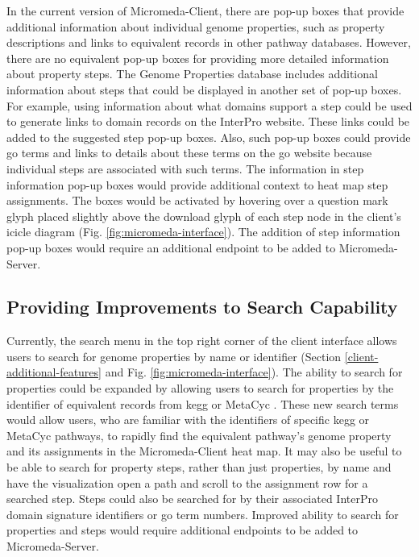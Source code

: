 In the current version of Micromeda-Client, there are pop-up boxes that provide 
additional information about individual genome properties, such as property 
descriptions and links to equivalent records in other pathway databases. 
However, there are no equivalent pop-up boxes for providing more detailed 
information about property steps. The Genome Properties database includes 
additional information about steps that could be displayed in another set of 
pop-up boxes. For example, using information about what domains support a step 
could be used to generate links to domain records on the InterPro website. These 
links could be added to the suggested step pop-up boxes. Also, such pop-up boxes 
could provide \gls{go} terms and links to details about these terms on the 
\gls{go} website because individual steps are associated with such terms. The 
information in step information pop-up boxes would provide additional context to 
heat map step assignments. The boxes would be activated by hovering over a 
question mark glyph placed slightly above the download glyph of each step node 
in the client's icicle diagram (Fig. \ref{fig:micromeda-interface}). The 
addition of step information pop-up boxes would require an additional endpoint 
to be added to Micromeda-Server.

\subsection{Providing Improvements to Search Capability}

Currently, the search menu in the top right corner of the client interface 
allows users to search for genome properties by name or identifier (Section 
\ref{client-additional-features} and Fig. \ref{fig:micromeda-interface}). The 
ability to search for properties could be expanded by allowing users to search 
for properties by the identifier of equivalent records from \gls{kegg} 
\cite{kanehisa2000kegg} or MetaCyc \cite{karp2002metacyc}. These new search 
terms would allow users, who are familiar with the identifiers of specific 
\gls{kegg} or MetaCyc pathways, to rapidly find the equivalent pathway's genome 
property and its assignments in the Micromeda-Client heat map. It may also be 
useful to be able to search for property steps, rather than just properties, by 
name and have the visualization open a path and scroll to the assignment row for 
a searched step. Steps could also be searched for by their associated InterPro 
domain signature identifiers or \gls{go} term numbers. Improved ability to 
search for properties and steps would require additional endpoints to be added 
to Micromeda-Server.

